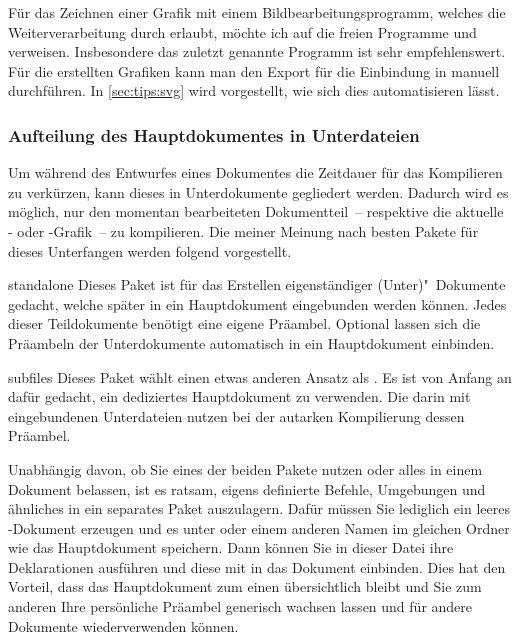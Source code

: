 Für das Zeichnen einer Grafik mit einem Bildbearbeitungsprogramm, welches die 
Weiterverarbeitung durch  erlaubt, möchte ich auf die freien 
Programme  und  verweisen. 
Insbesondere das zuletzt genannte Programm ist sehr empfehlenswert. Für die 
erstellten Grafiken kann man den Export für die Einbindung in  
manuell durchführen. In \autoref{sec:tips:svg} wird vorgestellt, wie sich dies 
automatisieren lässt.
%


\subsubsection{Aufteilung des Hauptdokumentes in Unterdateien}
Um während des Entwurfes eines Dokumentes die Zeitdauer für das Kompilieren zu 
verkürzen, kann dieses in Unterdokumente gegliedert werden. Dadurch wird es 
möglich, nur den momentan bearbeiteten Dokumentteil~-- respektive die aktuelle 
- oder -Grafik~-- zu kompilieren. Die meiner 
Meinung nach besten Pakete für dieses Unterfangen werden folgend vorgestellt.
%
\begin{packages}
\item[standalone]
  Dieses Paket ist für das Erstellen eigenständiger (Unter)"~Dokumente gedacht, 
  welche später in ein Hauptdokument eingebunden werden können. Jedes dieser 
  Teildokumente benötigt eine eigene Präambel. Optional lassen sich die 
  Präambeln der Unterdokumente automatisch in ein Hauptdokument einbinden.
\item[subfiles]
  Dieses Paket wählt einen etwas anderen Ansatz als . Es 
  ist von Anfang an dafür gedacht, ein dediziertes Hauptdokument zu verwenden. 
  Die darin mit  eingebundenen Unterdateien nutzen bei der 
  autarken Kompilierung dessen Präambel.
\end{packages}
%
Unabhängig davon, ob Sie eines der beiden Pakete nutzen oder alles in einem 
Dokument belassen, ist es ratsam, eigens definierte Befehle, Umgebungen und 
ähnliches in ein separates Paket auszulagern. Dafür müssen Sie lediglich ein 
leeres -Dokument erzeugen und es unter  
oder einem anderen Namen im gleichen Ordner wie das Hauptdokument speichern. 
Dann können Sie in dieser Datei ihre Deklarationen ausführen und diese mit 
 in das Dokument einbinden. Dies hat 
den Vorteil, dass das Hauptdokument zum einen übersichtlich bleibt und Sie zum 
anderen Ihre persönliche Präambel generisch wachsen lassen und für andere 
Dokumente wiederverwenden können.

